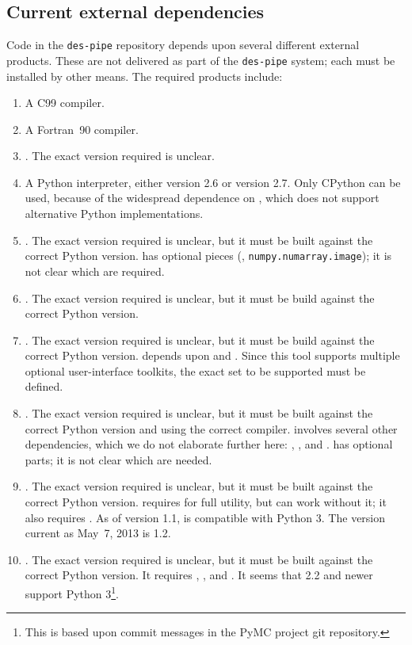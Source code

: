 \documentclass[draftmode,draftwater]{memarticle}
\begin{document}
\subsection{Current external dependencies}

Code in the \texttt{des-pipe} repository depends upon several different
external products. These are not delivered as part of the
\texttt{des-pipe} system; each must be installed by other means. The
required products include:
\begin{enumerate}
  \item A C99 compiler.
  \item A Fortran~90 compiler.
  \item {}. The exact version required is unclear.
  \item A Python interpreter, either version 2.6 or version 2.7. Only
    CPython can be used, because of the widespread dependence on
    , which does not support alternative Python
    implementations.
  \item {}. The exact version required is unclear, but it must
    be built against the correct Python version.  has
    optional pieces (\eg, \texttt{numpy.numarray.image}); it is not
    clear which are required.
  \item {}. The exact version required is unclear, but it
    must be build against the correct Python version.
  \item {}. The exact version required is unclear, but it
    must be build against the correct Python version. 
    depends upon  and . Since this tool
    supports multiple optional user-interface toolkits, the exact set to
    be supported must be defined.
  \item {}. The exact version required is unclear, but it must
    be built against the correct Python version and using the correct
    \cpp{} compiler.  involves several other dependencies,
    which we do not elaborate further here: ,
    , and .  has optional parts; it is
    not clear which are needed.
  \item {}. The exact version required is unclear, but it must
    be built against the correct Python version.  requires
     for full utility, but can work without it; it also
    requires . As of version 1.1,  is compatible
    with Python 3. The version current as May~7, 2013 is 1.2.
  \item {}. The exact version required is unclear, but it must
    be built against the correct Python version. It requires
    , , and . It seems that
     2.2 and newer support Python 3\footnote{This is based
      upon commit messages in the PyMC project git repository.}.
\end{enumerate}
\end{document}
